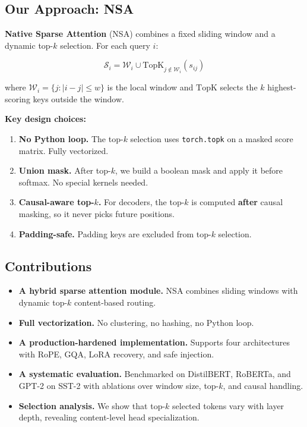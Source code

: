 \subsection{Our Approach: NSA}

\textbf{Native Sparse Attention} (NSA) combines a fixed sliding window and a 
dynamic top-$k$ selection. For each query $i$:

\[
\mathcal{S}_i = \mathcal{W}_i \cup \text{TopK}_{j \notin \mathcal{W}_i}(s_{ij})
\tag{1.1}
\]

where $\mathcal{W}_i = \{j : |i - j| \leq w\}$ is the local window and 
$\text{TopK}$ selects the $k$ highest-scoring keys outside the window.

\textbf{Key design choices:}

\begin{enumerate}
\item \textbf{No Python loop.} The top-$k$ selection uses \texttt{torch.topk} on a
  masked score matrix. Fully vectorized.
\item \textbf{Union mask.} After top-$k$, we build a boolean mask and apply it
  before softmax. No special kernels needed.
\item \textbf{Causal-aware top-$k$.} For decoders, the top-$k$ is computed
  \textbf{after} causal masking, so it never picks future positions.
\item \textbf{Padding-safe.} Padding keys are excluded from top-$k$ selection.

\end{enumerate}
\subsection{Contributions}

\begin{itemize}
\item \textbf{A hybrid sparse attention module.} NSA combines sliding windows with
  dynamic top-$k$ content-based routing.
\item \textbf{Full vectorization.} No clustering, no hashing, no Python loop.
\item \textbf{A production-hardened implementation.} Supports four architectures
  with RoPE, GQA, LoRA recovery, and safe injection.
\item \textbf{A systematic evaluation.} Benchmarked on DistilBERT, RoBERTa, and GPT-2
  on SST-2 with ablations over window size, top-$k$, and causal handling.
\item \textbf{Selection analysis.} We show that top-$k$ selected tokens vary with
  layer depth, revealing content-level head specialization.

\end{itemize}
